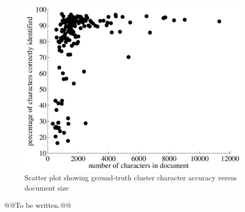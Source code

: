 \documentclass[times, 10pt,twocolumn]{article}
\begin{document}
\begin{figure}[ht]
  \centering
  \includegraphics[scale=.4]{figures/gt_character_accuracy}
  \caption{Scatter plot showing ground-truth cluster character accuracy versus 
           document size}
  \label{gtcharacc_fig}
\end{figure}


@@To be written.@@




\end{document}
